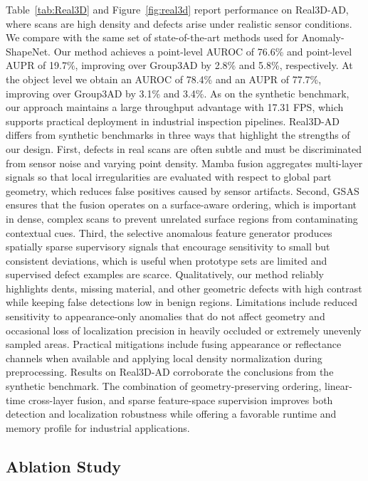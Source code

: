 Table~\ref{tab:Real3D} and Figure~\ref{fig:real3d} report performance on Real3D-AD, where scans are high density and defects arise under realistic sensor conditions. We compare with the same set of state-of-the-art methods used for Anomaly-ShapeNet. Our method achieves a point-level AUROC of 76.6\% and point-level AUPR of 19.7\%, improving over Group3AD by 2.8\% and 5.8\%, respectively. At the object level we obtain an AUROC of 78.4\% and an AUPR of 77.7\%, improving over Group3AD by 3.1\% and 3.4\%. As on the synthetic benchmark, our approach maintains a large throughput advantage with 17.31 FPS, which supports practical deployment in industrial inspection pipelines. Real3D-AD differs from synthetic benchmarks in three ways that highlight the strengths of our design. First, defects in real scans are often subtle and must be discriminated from sensor noise and varying point density. Mamba fusion aggregates multi-layer signals so that local irregularities are evaluated with respect to global part geometry, which reduces false positives caused by sensor artifacts. Second, GSAS ensures that the fusion operates on a surface-aware ordering, which is important in dense, complex scans to prevent unrelated surface regions from contaminating contextual cues. Third, the selective anomalous feature generator produces spatially sparse supervisory signals that encourage sensitivity to small but consistent deviations, which is useful when prototype sets are limited and supervised defect examples are scarce. Qualitatively, our method reliably highlights dents, missing material, and other geometric defects with high contrast while keeping false detections low in benign regions. Limitations include reduced sensitivity to appearance-only anomalies that do not affect geometry and occasional loss of localization precision in heavily occluded or extremely unevenly sampled areas. Practical mitigations include fusing appearance or reflectance channels when available and applying local density normalization during preprocessing. Results on Real3D-AD corroborate the conclusions from the synthetic benchmark. The combination of geometry-preserving ordering, linear-time cross-layer fusion, and sparse feature-space supervision improves both detection and localization robustness while offering a favorable runtime and memory profile for industrial applications.

\subsection{Ablation Study}

